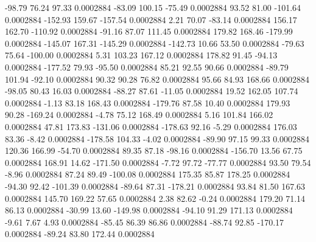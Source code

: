       -98.79       76.24       97.33     0.0002884
      -83.09      100.15      -75.49     0.0002884
       93.52       81.00     -101.64     0.0002884
     -152.93      159.67     -157.54     0.0002884
        2.21       70.07      -83.14     0.0002884
      156.17      162.70     -110.92     0.0002884
      -91.16       87.07      111.45     0.0002884
      179.82      168.46     -179.99     0.0002884
     -145.07      167.31     -145.29     0.0002884
     -142.73       10.66       53.50     0.0002884
      -79.63       75.64     -100.00     0.0002884
        5.31      103.23      167.12     0.0002884
      178.82       91.45      -94.13     0.0002884
     -177.52       79.93      -95.50     0.0002884
       85.21       92.55       90.66     0.0002884
      -89.79      101.94      -92.10     0.0002884
       90.32       90.28       76.82     0.0002884
       95.66       84.93      168.66     0.0002884
      -98.05       80.43       16.03     0.0002884
      -88.27       87.61      -11.05     0.0002884
       19.52      162.05      107.74     0.0002884
       -1.13       83.18      168.43     0.0002884
     -179.76       87.58       10.40     0.0002884
      179.93       90.28     -169.24     0.0002884
       -4.78       75.12      168.49     0.0002884
        5.16      101.84      166.02     0.0002884
       47.81      173.83     -131.06     0.0002884
     -178.63       92.16       -5.29     0.0002884
      176.03       83.36       -8.42     0.0002884
     -178.58      104.33       -4.02     0.0002884
      -89.90       97.15       99.33     0.0002884
      120.36      166.99      -54.70     0.0002884
       89.35       87.18      -98.16     0.0002884
     -156.70       13.56       67.75     0.0002884
      168.91       14.62     -171.50     0.0002884
       -7.72       97.72      -77.77     0.0002884
       93.50       79.54       -8.96     0.0002884
       87.24       89.49     -100.08     0.0002884
      175.35       85.87      178.25     0.0002884
      -94.30       92.42     -101.39     0.0002884
      -89.64       87.31     -178.21     0.0002884
       93.84       81.50      167.63     0.0002884
      145.70      169.22       57.65     0.0002884
        2.38       82.62       -0.24     0.0002884
      179.20       71.14       86.13     0.0002884
      -30.99       13.60     -149.98     0.0002884
      -94.10       91.29      171.13     0.0002884
       -9.61        7.67        4.93     0.0002884
      -85.45       86.39       86.86     0.0002884
      -88.74       92.85     -170.17     0.0002884
      -89.24       83.80      172.44     0.0002884
